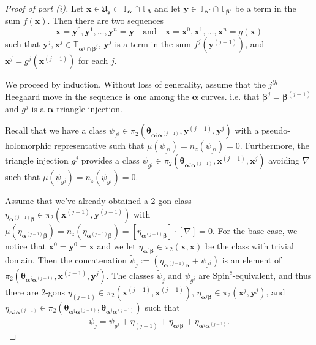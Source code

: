 \documentclass[11pt]{article}
\theoremstyle{plain} \newtheorem{thm}{Theorem}[subsection]
\theoremstyle{plain} \newtheorem{cor}[thm]{Corollary}
\theoremstyle{plain} \newtheorem{prop}[thm]{Proposition}
\theoremstyle{plain} \newtheorem{conj}[thm]{Conjecture}
\theoremstyle{plain} \newtheorem{lem}[thm]{Lemma}
\theoremstyle{definition} \newtheorem{df}[thm]{Definition}
\theoremstyle{remark} \newtheorem{rmk}[thm]{Remark}
\theoremstyle{remark} \newtheorem{obs}[thm]{Observation}
\newcommand{\tld}[1]{\widetilde{#1}}
\newcommand{\Us}{\mathfrak{U}_{\mathfrak{s}}}
\newcommand{\ba}{\boldsymbol{\alpha}}
\newcommand{\bb}{\boldsymbol{\beta}}
\newcommand{\Ta}{\mathbb{T}_{\ba}}
\newcommand{\Tb}{\mathbb{T}_{\bb}}
\newcommand{\bx}{\mathbf{x}}
\newcommand{\by}{\mathbf{y}}
\newcommand{\thet}[1]{\boldsymbol{\theta}_{#1}}
\newcommand{\tor}[1]{\mathbb{T}_{#1}}
\newcommand{\AD}{\nabla}
\begin{document}
\begin{proof}[Proof of part (i)]
Let $\bx \in \Us \subset \Ta \cap \Tb$ and let $\by \in \tor{\ba'} \cap \tor{\bb'}$ be a term in the sum $f(\bx)$.  Then there are two sequences
$$ \bx = \by^0, \by^1, \ldots, \by^n = \by \quad \text{and} \quad \bx = \bx^0, \bx^1, \ldots, \bx^n = g(\bx)$$
such that $\by^j, \bx^j \in \tor{\ba^j \cap \bb^j}$, $\by^j$ is a term in the sum $f^j(\by^{(j-1)})$, and $\bx^j = g^j(\bx^{(j-1)})$ for each $j$.

We proceed by induction.  Without loss of generality, assume that the $j^{th}$ Heegaard move in the sequence is one among the $\ba$ curves. i.e. that $\bb^j = \bb^{(j-1)}$ and $g^j$ is a $\ba$-triangle injection.

Recall that we have a class $\psi_{f^{j}} \in \pi_{2}(\thet{\ba^{j} \ba^{(j-1)}}, \by^{(j-1)}, \by^{j})$ with a pseudo-holomorphic representative such that $\mu(\psi_{f^{j}}) = n_z(\psi_{f^{j}}) =  0$.  Furthermore, the triangle injection $g^{j}$ provides a class $\psi_{g^{j}} \in \pi_{2}(\thet{\ba^{j} \ba^{(j-1)}}, \bx^{(j-1)}, \bx^j)$ avoiding $\AD$ such that $\mu(\psi_{g^{j}}) =  n_z(\psi_{g^{j}})  = 0$.

Assume that we've already obtained a 2-gon class $\eta_{\ba^{(j-1)}\bb} \in \pi_{2}(\bx^{(j-1)}, \by^{(j-1)})$ with $\mu(\eta_{\ba^{(j-1)}\bb}) = n_z(\eta_{\ba^{(j-1)}\bb})= [\eta_{\ba^{(j-1)}\bb}]\cdot [\AD] = 0$.  For the base case, we notice that $\bx^0 = \by^0 = \bx$ and we let $\eta_{\ba^{0}\bb} \in \pi_2(\bx, \bx)$ be the class with trivial domain.  Then the concatenation $\tld{\psi}_j := ( \eta_{\ba^{(j-1)}\ba} + \psi_{f^{j}})$ is an element of $\pi_{2}(\thet{\ba^{j} \ba^{(j-1)}}, \bx^{(j-1)},  \by^{j})$.  The classes $\tld{\psi}_j$ and $\psi_{g^{j}}$ are $\text{Spin}^{c}$-equivalent, and thus there are 2-gons $\eta_{(j-1)} \in \pi_{2}(\bx^{(j-1)}, \bx^{(j-1)})$, $\eta_{\ba^{j}\bb} \in \pi_{2}(\bx^j,  \by^{j})$, and $\eta_{\ba^{j}\ba^{(j-1)}} \in \pi_{2}(\thet{\ba^{j}\ba^{(j-1)}},\thet{\ba^{j}\ba^{(j-1)}})$ such that
$$\tld{\psi}_{j} = \psi_{g^{j}} + \eta_{(j-1)} + \eta_{\ba^{j}\bb} + \eta_{\ba^{j}\ba^{(j-1)}}.$$


\end{proof}
\end{document}
